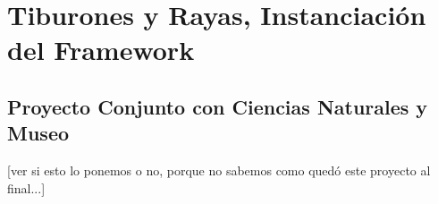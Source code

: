 \chapter{Tiburones y Rayas, Instanciación del Framework}

\section{Proyecto Conjunto con Ciencias Naturales y Museo}
[ver si esto lo ponemos o no, porque no sabemos como quedó este proyecto al final...]